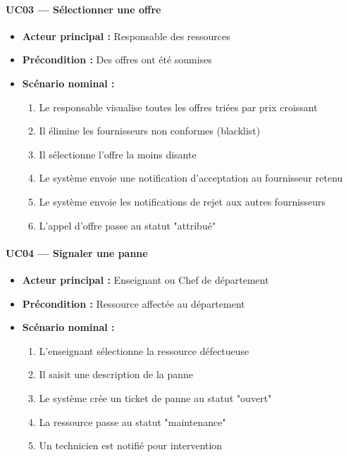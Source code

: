 \paragraph{UC03 — Sélectionner une offre}
\begin{itemize}
    \item \textbf{Acteur principal :} Responsable des ressources
    \item \textbf{Précondition :} Des offres ont été soumises
    \item \textbf{Scénario nominal :}
    \begin{enumerate}
        \item Le responsable visualise toutes les offres triées par prix croissant
        \item Il élimine les fournisseurs non conformes (blacklist)
        \item Il sélectionne l'offre la moins disante
        \item Le système envoie une notification d'acceptation au fournisseur retenu
        \item Le système envoie les notifications de rejet aux autres fournisseurs
        \item L'appel d'offre passe au statut "attribué"
    \end{enumerate}
\end{itemize}

\paragraph{UC04 — Signaler une panne}
\begin{itemize}
    \item \textbf{Acteur principal :} Enseignant ou Chef de département
    \item \textbf{Précondition :} Ressource affectée au département
    \item \textbf{Scénario nominal :}
    \begin{enumerate}
        \item L'enseignant sélectionne la ressource défectueuse
        \item Il saisit une description de la panne
        \item Le système crée un ticket de panne au statut "ouvert"
        \item La ressource passe au statut "maintenance"
        \item Un technicien est notifié pour intervention
    \end{enumerate}
\end{itemize}

